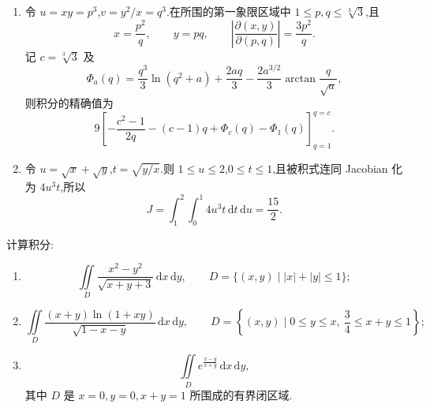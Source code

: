 \begin{solution}
    \leavevmode
    \begin{enumerate}
        \item 令 $u=xy=p^3$,$v=y^2/x=q^3$.在所围的第一象限区域中 $1\leq p,q\leq\sqrt[3]{3}$,且
              \[
                  x=\dfrac{p^2}{q},\qquad y=pq,\qquad
                  \left|\dfrac{\partial(x,y)}{\partial(p,q)}\right|=\dfrac{3p^2}{q}.
              \]
              记 $c=\sqrt[3]{3}$ 及
              \[
                  \Phi_a(q)=\dfrac{q^3}{3}\ln(q^2+a)+\dfrac{2aq}{3}
                  -\dfrac{2a^{3/2}}{3}\arctan\dfrac{q}{\sqrt a},
              \]
              则积分的精确值为
              \[
                  9\left[-\dfrac{c^2-1}{2q}-(c-1)q+\Phi_c(q)-\Phi_1(q)\right]_{q=1}^{q=c}.
              \]
        \item 令 $u=\sqrt{x}+\sqrt{y}$,$t=\sqrt{y/x}$.则 $1\leq u\leq2$,$0\leq t\leq1$,且被积式连同 Jacobian 化为 $4u^3t$,所以
              \[
                  J=\int_1^2\!\int_0^1 4u^3t\,\mathrm{d}t\,\mathrm{d}u=\dfrac{15}{2}.
              \]
    \end{enumerate}
\end{solution}

\begin{example}
    计算积分:
    \begin{enumerate}
        \item
              \[
                  \displaystyle\iint\limits_D\dfrac{x^2-y^2}{\sqrt{x+y+3}}\,\mathrm{d}x\,\mathrm{d}y,
                  \qquad D=\{(x,y)\mid |x|+|y|\leq1\};
              \]
        \item
              \[
                  \displaystyle\iint\limits_D\dfrac{(x+y)\ln(1+xy)}{\sqrt{1-x-y}}\,\mathrm{d}x\,\mathrm{d}y,
                  \qquad D=\left\{(x,y)\mid0\leq y\leq x,\ \dfrac{3}{4}\leq x+y\leq1\right\};
              \]
        \item
              \[
                  \displaystyle\iint\limits_De^{\frac{x-y}{x+y}}\,\mathrm{d}x\,\mathrm{d}y,
              \]
              其中 $D$ 是 $x=0,y=0,x+y=1$ 所围成的有界闭区域.
    \end{enumerate}
\end{example}
\exampleblank

